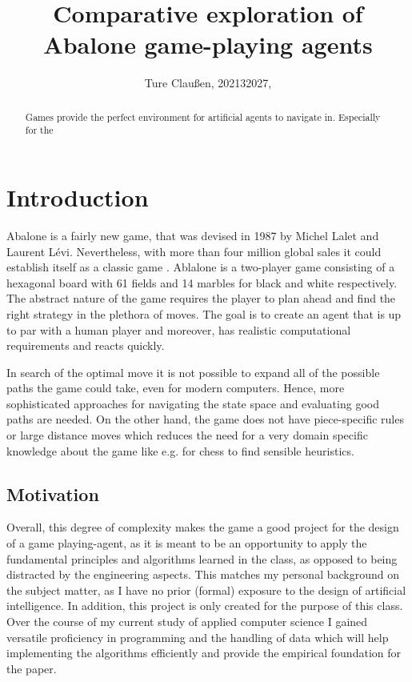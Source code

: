\documentclass{llncs}
\begin{document}
\title{Comparative exploration of Abalone game-playing agents}
\author{Ture Claußen, 202132027, }

{\def\addcontentsline#1#2#3{}\maketitle} %

\begin{abstract}
  Games provide the perfect environment for artificial agents to navigate in. Especially for the
\end{abstract}

\section{Introduction}

Abalone is a fairly new game, that was devised in 1987 by Michel Lalet and Laurent Lévi. Nevertheless, with more than four million global sales it could establish itself as a classic game \cite{noauthor_abalone_2020}. Ablalone is a two-player game consisting of a hexagonal board with 61 fields and 14 marbles for black and white respectively. The abstract nature of the game requires the player to plan ahead and find the right strategy in the plethora of moves. The goal is to create an agent that is up to par with a human player and moreover, has realistic computational requirements and reacts quickly.

In search of the optimal move it is not possible to expand all of the possible paths the game could take, even for modern computers. Hence, more sophisticated approaches for navigating the state space and evaluating good paths are needed. On the other hand, the game does not have piece-specific rules or large distance moves which reduces the need for a very domain specific knowledge about the game like e.g. for chess to find sensible heuristics.

\subsection{Motivation}
Overall, this degree of complexity makes the game a good project for the design of a game playing-agent, as it is meant to be an opportunity to apply the fundamental principles and algorithms learned in the class, as opposed to being distracted by the engineering aspects. This matches my personal background on the subject matter, as I have no prior (formal) exposure to the design of artificial intelligence. In addition, this project is only created for the purpose of this class. Over the course of my current study of applied computer science I gained versatile proficiency in programming and the handling of data which will help implementing the algorithms efficiently and provide the empirical foundation for the paper.
\end{document}

